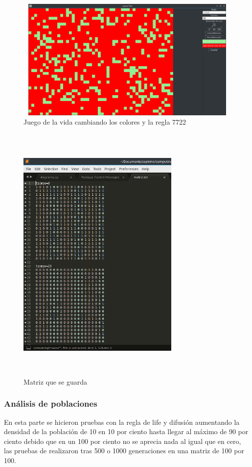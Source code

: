 \begin{figure}[H]
\begin{center}
 \includegraphics[width=13cm, height=6cm]{./img/gol_colores.png}
 \caption{Juego de la vida cambiando los colores y la regla 7722}
 \label{fig:gol_colores}
\end{center}
\end{figure}

\begin{figure}[H]
\begin{center}
 \includegraphics[width=8cm, height=13cm]{./img/matriz.png}
 \caption{Matriz que se guarda}
 \label{fig:matriz}
\end{center}
\end{figure}

\subsubsection{Análisis de poblaciones}
En esta parte se hicieron pruebas con la regla de life y difusión aumentando la densidad de la población de 10 en 10 por ciento hasta llegar al máximo de 90 por ciento debido que en un 100 por ciento no se aprecia nada al igual que en cero, las pruebas de realizaron tras 500 o 1000 generaciones en una matriz de 100 por 100.


